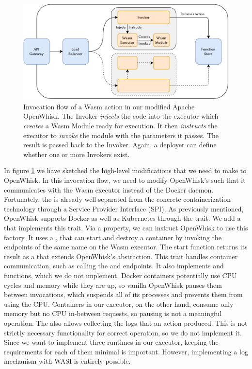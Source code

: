 \begin{figure}
    \centering
    \includegraphics[width=\textwidth]{figures/WasmOpenWhiskActionInvocationFlow.pdf}
    \caption{Invocation flow of a Wasm action in our modified Apache OpenWhisk. The Invoker \emph{injects} the code into the executor which \emph{creates} a Wasm Module ready for execution. It then \emph{instructs} the executor to \emph{invoke} the module with the parameters it passes. The result is passed back to the Invoker. Again, a deployer can define whether one or more Invokers exist.}
    \label{fig:wasm-openwhisk-action-invocation-flow}
\end{figure}

In figure \ref{fig:wasm-openwhisk-action-invocation-flow} we have sketched the high-level modifications that we need to make to OpenWhisk. In this invocation flow, we need to modify OpenWhisk's  such that it communicates with the Wasm executor instead of the Docker daemon. Fortunately, the  is already well-separated from the concrete containerization technology through a Service Provider Interface (SPI). As previously mentioned, OpenWhisk supports Docker as well as Kubernetes through the  trait. We add a  that implements this trait. Via a property, we can instruct OpenWhisk to use this factory. It uses a , that can start and destroy a container by invoking the endpoints of the same name on the Wasm executor. The start function returns its result as a  that extends OpenWhisk's  abstraction. This trait handles container communication, such as calling the  and  endpoints. It also implements  and  functions, which we do not implement. Docker containers potentially use CPU cycles and memory while they are up, so vanilla OpenWhisk pauses them between invocations, which suspends all of its processes and prevents them from using the CPU. Containers in our executor, on the other hand, consume only memory but no CPU in-between requests, so pausing is not a meaningful operation. The  also allows collecting the logs that an action produced. This is not strictly necessary functionality for correct operation, so we do not implement it. Since we want to implement three runtimes in our executor, keeping the requirements for each of them minimal is important. However, implementing a log mechanism with WASI is entirely possible.

